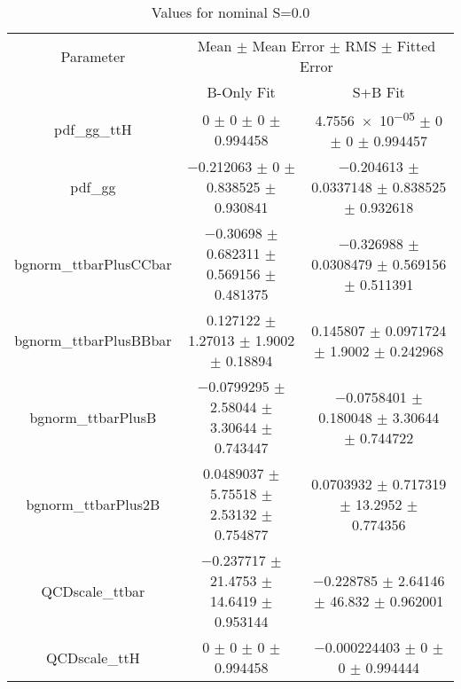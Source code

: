 \begin{table}
\centering
\caption{Values for nominal S=0.0}
\begin{tabular}{ccc}
\toprule
Parameter & \multicolumn{2}{c}{Mean $\pm$ Mean Error $\pm$ RMS $\pm$ Fitted Error}\\
 & B-Only Fit & S+B Fit\\
\midrule
pdf\_gg\_ttH & \num{0} $\pm$ \num{0} $\pm$ \num{0} $\pm$ \num{0.994458} & \num{4.7556e-05} $\pm$ \num{0} $\pm$ \num{0} $\pm$ \num{0.994457}\\
pdf\_gg & \num{-0.212063} $\pm$ \num{0} $\pm$ \num{0.838525} $\pm$ \num{0.930841} & \num{-0.204613} $\pm$ \num{0.0337148} $\pm$ \num{0.838525} $\pm$ \num{0.932618}\\
bgnorm\_ttbarPlusCCbar & \num{-0.30698} $\pm$ \num{0.682311} $\pm$ \num{0.569156} $\pm$ \num{0.481375} & \num{-0.326988} $\pm$ \num{0.0308479} $\pm$ \num{0.569156} $\pm$ \num{0.511391}\\
bgnorm\_ttbarPlusBBbar & \num{0.127122} $\pm$ \num{1.27013} $\pm$ \num{1.9002} $\pm$ \num{0.18894} & \num{0.145807} $\pm$ \num{0.0971724} $\pm$ \num{1.9002} $\pm$ \num{0.242968}\\
bgnorm\_ttbarPlusB & \num{-0.0799295} $\pm$ \num{2.58044} $\pm$ \num{3.30644} $\pm$ \num{0.743447} & \num{-0.0758401} $\pm$ \num{0.180048} $\pm$ \num{3.30644} $\pm$ \num{0.744722}\\
bgnorm\_ttbarPlus2B & \num{0.0489037} $\pm$ \num{5.75518} $\pm$ \num{2.53132} $\pm$ \num{0.754877} & \num{0.0703932} $\pm$ \num{0.717319} $\pm$ \num{13.2952} $\pm$ \num{0.774356}\\
QCDscale\_ttbar & \num{-0.237717} $\pm$ \num{21.4753} $\pm$ \num{14.6419} $\pm$ \num{0.953144} & \num{-0.228785} $\pm$ \num{2.64146} $\pm$ \num{46.832} $\pm$ \num{0.962001}\\
QCDscale\_ttH & \num{0} $\pm$ \num{0} $\pm$ \num{0} $\pm$ \num{0.994458} & \num{-0.000224403} $\pm$ \num{0} $\pm$ \num{0} $\pm$ \num{0.994444}\\
\bottomrule
\end{tabular}
\end{table}